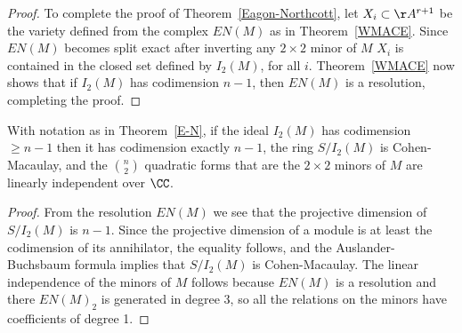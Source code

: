 \begin{proof}
% 

To complete the proof of Theorem~\ref{Eagon-Northcott},
let $X_{i}\subset \AA^{r+1}$ be the variety defined from the complex $EN(M)$ as in 
Theorem~\ref{WMACE}. Since $EN(M)$ becomes split exact after inverting any $2\times 2$ minor of $M$
$X_{i}$ is
contained in the closed set defined by $I_{2}(M)$, for all $i$. Theorem~\ref{WMACE} now shows that
 if $I_{2}(M)$ has codimension $n-1$,
then $EN(M)$ is a resolution, completing the proof.
\end {proof}

\begin{corollary}\label{E-N cor}
With notation as in Theorem~\ref{E-N}, if the ideal $I_2(M)$ has codimension $\geq n-1$ then it has
codimension exactly $n-1$, the ring $S/I_2(M)$ is Cohen-Macaulay, and the $\binom{n}{2}$ quadratic forms
that are the $2\times 2$ minors of $M$ are linearly independent over $\CC$.
\end{corollary}

\begin{proof}
From the resolution $EN(M)$ we see that the projective dimension of $S/I_2(M)$ is $n-1$. Since the projective dimension of a module
is at least the codimension of its annihilator, the equality follows, and the Auslander-Buchsbaum formula implies that $S/I_2(M)$ is 
Cohen-Macaulay. The linear independence of the minors of $M$ follows because $EN(M)$ is a resolution and there
$EN(M)_2$ is generated in degree 3, so all the relations on the minors have coefficients of degree 1.
\end{proof}

